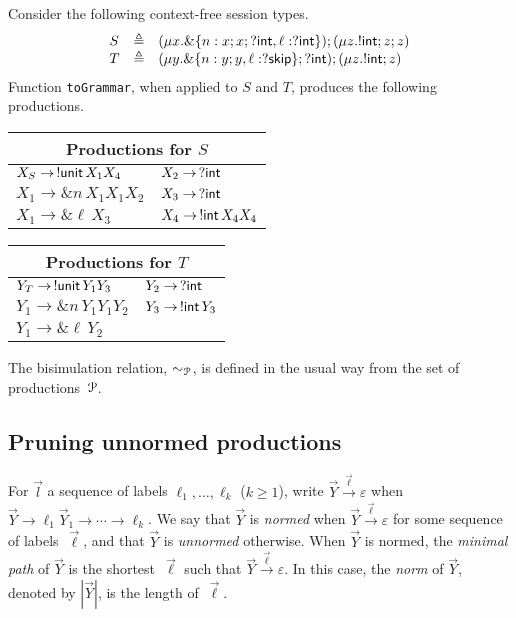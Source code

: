 \begin{example}
\label{ex:productions}
Consider the following context-free session types.
%
\begin{equation*}
\begin{array}{lll}
    S & \triangleq & (\mu x . \&\{n: x;x;?\mathsf{int}, \ell: ?\mathsf{int}\});(\mu z . !\mathsf{int} ; z;z)\\
    T & \triangleq & (\mu y . \&\{n: y;y, \ell: ?\mathsf{skip}\};?\mathsf{int});(\mu z . !\mathsf{int} ; z)
\end{array}
\end{equation*}
%
Function \lstinline{toGrammar}, when applied to $S$ and $T$, produces
the following productions.
\begin{center}
  \begin{tabular}{l l}
    \multicolumn{2}{c}{Productions for $S$}\\ \hline
    $X_S \rightarrow \,!\mathsf{unit}\, X_1 X_4$ &$X_2 \rightarrow \,? \mathsf{int}$\\
    $X_1 \rightarrow \& n\, X_1 X_1 X_2$&$X_3 \rightarrow \,? \mathsf{int}$\\
    $X_1 \rightarrow \& \ell\, X_3$ &$X_4 \rightarrow \,!\mathsf{int}\, X_4 X_4$\\
  \end{tabular} \qquad
  \begin{tabular}{l l}
    \multicolumn{2}{c}{Productions for $T$}\\ \hline
    $Y_T \rightarrow \,!\mathsf{unit}\, Y_1 Y_3 $&$Y_2 \rightarrow \,? \mathsf{int}$\\
    $Y_1 \rightarrow \& n\, Y_1 Y_1 Y_2 $&$Y_3 \rightarrow \,!\mathsf{int}\, Y_3$\\
    $Y_1 \rightarrow \& \ell \,Y_2 $ &
  \end{tabular}
\end{center}
\end{example}

The bisimulation relation, $\sim_{\mathcal P}$, is defined in the usual way
from the set of productions~$\mathcal P$.

\subsection{Pruning unnormed productions}
\label{subsec:prune}

For $\vec l$ a sequence of labels $\ell_1,\ldots, \ell_k$ ($k\ge1$),
write $\vec Y \xrightarrow{\vec \ell} \varepsilon$ when
$\vec Y \rightarrow \ell_1\vec Y_1 \rightarrow \cdots \rightarrow
\ell_k$. 
%
We say that $\vec Y$ is \emph{normed} when
$\vec Y \xrightarrow{\vec \ell} \varepsilon$ for some sequence of
labels~$\vec \ell$, and that $\vec Y$ is \emph{unnormed} otherwise.
%
When $\vec Y$ is normed, the \emph{minimal path} of $\vec Y$ is the
shortest~$\vec \ell$ such that $\vec Y \xrightarrow{\vec\ell}
\varepsilon$.
%
In this case, the \emph{norm} of $\vec Y$, denoted by $|\vec Y|$, is
the length of~$\vec\ell$.

